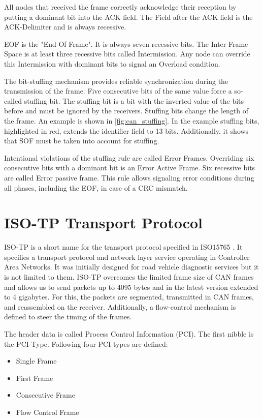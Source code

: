 All nodes that received the frame correctly acknowledge their reception by putting a dominant bit into the ACK field.
The Field after the ACK field is the ACK-Delimiter and is always recessive.

EOF is the "End Of Frame". It is always seven recessive bits.
The Inter Frame Space is at least three recessive bits called Intermission.
Any node can override this Intermission with dominant bits to signal an Overload condition.



The bit-stuffing mechanism provides reliable synchronization during the transmission of the frame.
Five consecutive bits of the same value force a so-called stuffing bit.
The stuffing bit is a bit with the inverted value of the bits before and must be ignored by the receivers.
Stuffing bits change the length of the frame. An example is shown in \autoref{fig:can_stuffing}.
In the example stuffing bits, highlighted in red, extends the identifier field to 13 bits.
Additionally, it shows that SOF must be taken into account for stuffing.

Intentional violations of the stuffing rule are called Error Frames.
Overriding six consecutive bits with a dominant bit is an Error Active Frame.
Six recessive bits are called Error passive frame.
This rule allows signaling error conditions during all phases, including the EOF, in case of a CRC mismatch.

\FloatBarrier

\section{ISO-TP Transport Protocol}
\label{sec:iso_tp}

ISO-TP is a short name for the transport protocol specified in ISO15765 \cite{ISO15765}.
It specifies a transport protocol and network layer service operating in Controller Area Networks.
It was initially designed for road vehicle diagnostic services but it is not limited to them.
ISO-TP overcomes the limited frame size of CAN frames and allows us to send packets up to 4095 bytes and in the latest version extended to 4 gigabytes.
For this, the packets are segmented, transmitted in CAN frames, and reassembled on the receiver.
Additionally, a flow-control mechanism is defined to steer the timing of the frames.

The header data is called Process Control Information (PCI). The first nibble is the PCI-Type.
Following four PCI types are defined:
\begin{itemize}
	\item Single Frame
	\item First Frame
	\item Consecutive Frame
	\item Flow Control Frame
\end{itemize}


